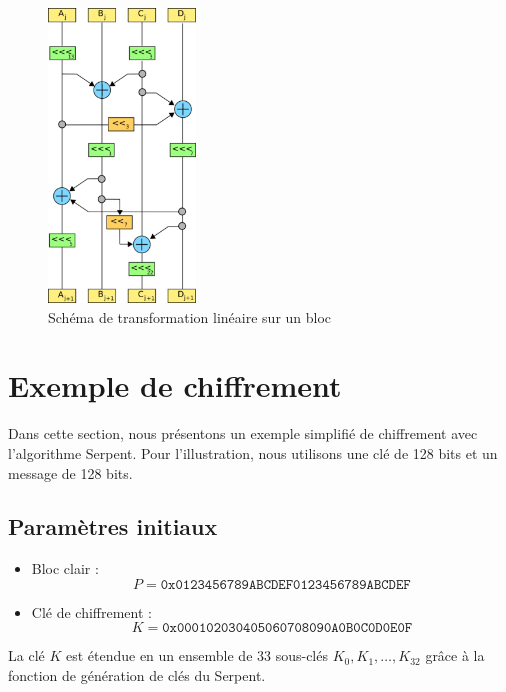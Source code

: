 \documentclass[12pt,a4paper]{report}
\begin{document}
\begin{figure}[h]
    \centering
    \includegraphics[width=0.35\textwidth]{assets/serpent-global.png}
    \caption{Schéma de transformation linéaire sur un bloc}
\end{figure}









\section*{Exemple de chiffrement}

\setcounter{subsection}{0}

Dans cette section, nous présentons un exemple simplifié de chiffrement avec
l’algorithme Serpent.  
Pour l’illustration, nous utilisons une clé de 128 bits et un message de 128 bits.

\subsection{Paramètres initiaux}

\begin{itemize}
    \item Bloc clair : 
    \[
        P = \texttt{0x0123456789ABCDEF0123456789ABCDEF}
    \]
    \item Clé de chiffrement : 
    \[
        K = \texttt{0x000102030405060708090A0B0C0D0E0F}
    \]
\end{itemize}

La clé $K$ est étendue en un ensemble de 33 sous-clés $K_0, K_1, \dots, K_{32}$ 
grâce à la fonction de génération de clés du Serpent.
\end{document}
